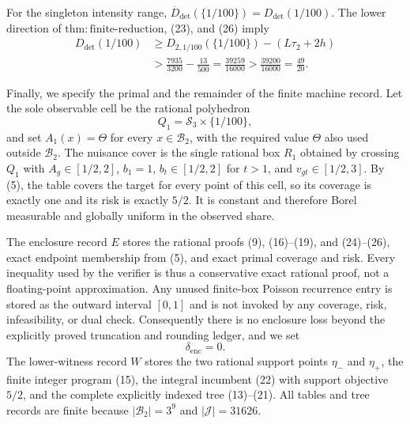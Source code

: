 For the singleton intensity range, \(\overline D_{\mathrm{det}}(\{1/100\})=D_{\mathrm{det}}(1/100)\). The lower direction of \(\mathrm{thm{:}finite\text{-}reduction}\), (23), and (26) imply
\[
 \begin{aligned}
 D_{\mathrm{det}}(1/100)
 &\ge D_{2,1/100}(\{1/100\})-(L\tau_2+2h)\\
 &>\frac{7935}{3200}-\frac{13}{500}
 =\frac{39259}{16000}
 >\frac{39200}{16000}=\frac{49}{20}.
\end{aligned}
\tag{27}
\]

Finally, we specify the primal and the remainder of the finite machine record. Let the sole observable cell be the rational polyhedron
\[
 Q_1=\mathcal S_3\times\{1/100\},
\]
and set \(A_1(x)=\Theta\) for every \(x\in\mathcal B_2\), with the required value \(\Theta\) also used outside \(\mathcal B_2\). The nuisance cover is the single rational box \(R_1\) obtained by crossing \(Q_1\) with \(A_g\in[1/2,2]\), \(b_1=1\), \(b_t\in[1/2,2]\) for \(t>1\), and \(v_{gt}\in[1/2,3]\). By (5), the table covers the target for every point of this cell, so its coverage is exactly one and its risk is exactly \(5/2\). It is constant and therefore Borel measurable and globally uniform in the observed share.

The enclosure record \(E\) stores the rational proofs (9), (16)--(19), and (24)--(26), exact endpoint membership from (5), and exact primal coverage and risk. Every inequality used by the verifier is thus a conservative exact rational proof, not a floating-point approximation. Any unused finite-box Poisson recurrence entry is stored as the outward interval \([0,1]\) and is not invoked by any coverage, risk, infeasibility, or dual check. Consequently there is no enclosure loss beyond the explicitly proved truncation and rounding ledger, and we set
\[
 \delta_{\mathrm{enc}}=0.
\tag{28}
\]
The lower-witness record \(W\) stores the two rational support points \(\eta_-\) and \(\eta_+\), the finite integer program (15), the integral incumbent (22) with support objective \(5/2\), and the complete explicitly indexed tree (13)--(21). All tables and tree records are finite because \(|\mathcal B_2|=3^9\) and \(|\mathscr J|=31626\).


